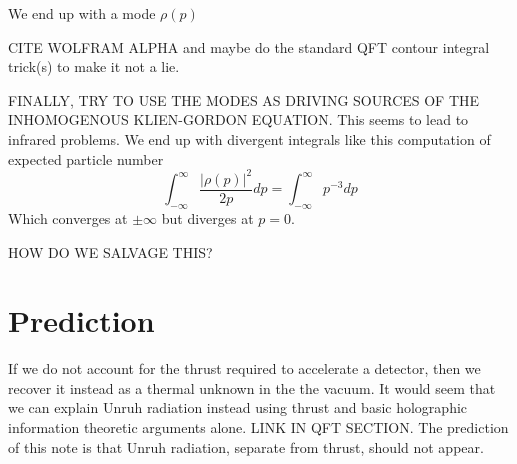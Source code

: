 \documentclass[12pt,a4paper]{article}
\begin{document}
We end up with a mode $\rho(p)$

CITE WOLFRAM ALPHA and maybe do the standard QFT contour integral trick(s) to make it not a lie.

FINALLY, TRY TO USE THE MODES AS DRIVING SOURCES OF THE INHOMOGENOUS KLIEN-GORDON EQUATION.  This seems to lead to infrared problems.  We end up with divergent integrals like this computation of expected particle number \cite{Frodden}
\[
 \int_{-\infty}^\infty \frac {|\rho(p)|^2}{2p} dp = \int_{-\infty}^\infty p^{-3} dp
\]
Which converges at $\pm \infty$ but diverges at $p=0$.

 
HOW DO WE SALVAGE THIS?


\section{Prediction}
If we do not account for the thrust required to accelerate a detector, then we recover it instead as a thermal unknown in the the vacuum.  It would seem that we can explain Unruh radiation instead using thrust and basic holographic information theoretic arguments alone.  LINK IN QFT SECTION. The prediction of this note is that Unruh radiation, separate from thrust, should not appear.



\end{document}
